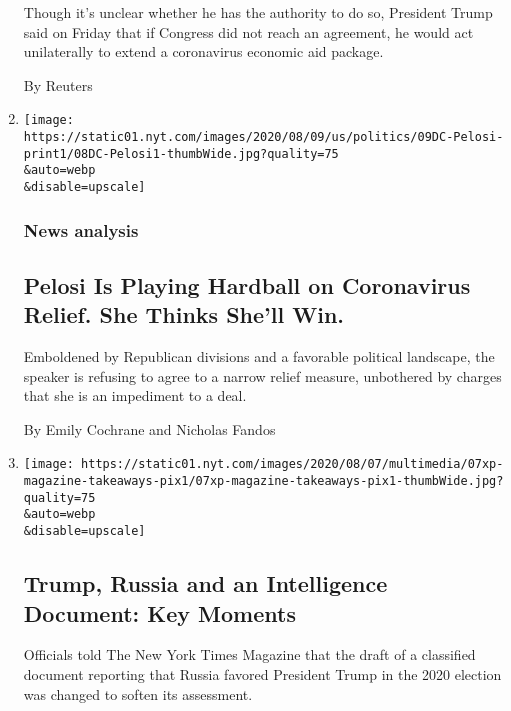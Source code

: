 \begin{enumerate}
  Though it's unclear whether he has the authority to do so, President
  Trump said on Friday that if Congress did not reach an agreement, he
  would act unilaterally to extend a coronavirus economic aid package.

  By Reuters
\item
  \href{/2020/08/08/us/politics/nancy-pelosi-coronavirus-relief.html}{}

  \texttt{[image: https://static01.nyt.com/images/2020/08/09/us/politics/09DC-Pelosi-print1/08DC-Pelosi1-thumbWide.jpg?quality=75\\\&auto=webp\\\&disable=upscale]}

  \hypertarget{news-analysis-1}{%
  \subsubsection{News analysis}\label{news-analysis-1}}

  \hypertarget{pelosi-is-playing-hardball-on-coronavirus-relief-she-thinks-shell-win-1}{%
  \subsection{Pelosi Is Playing Hardball on Coronavirus Relief. She
  Thinks She'll
  Win.}\label{pelosi-is-playing-hardball-on-coronavirus-relief-she-thinks-shell-win-1}}

  Emboldened by Republican divisions and a favorable political
  landscape, the speaker is refusing to agree to a narrow relief
  measure, unbothered by charges that she is an impediment to a deal.

  By Emily Cochrane and Nicholas Fandos
\item
  \href{/2020/08/08/us/politics/trump-russia.html}{}

  \texttt{[image: https://static01.nyt.com/images/2020/08/07/multimedia/07xp-magazine-takeaways-pix1/07xp-magazine-takeaways-pix1-thumbWide.jpg?quality=75\\\&auto=webp\\\&disable=upscale]}

  \hypertarget{trump-russia-and-an-intelligence-document-key-moments-1}{%
  \subsection{Trump, Russia and an Intelligence Document: Key
  Moments}\label{trump-russia-and-an-intelligence-document-key-moments-1}}

  Officials told The New York Times Magazine that the draft of a
  classified document reporting that Russia favored President Trump in
  the 2020 election was changed to soften its assessment.


\end{enumerate}
